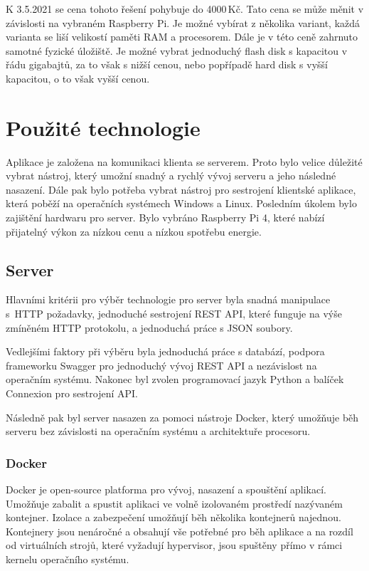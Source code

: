 \documentclass[
  glossaries,
]{kidiplom}
\begin{document}
K 3.5.2021 se cena tohoto řešení pohybuje do 4000\,Kč. Tato cena se může měnit v závislosti na vybraném Raspberry Pi. Je možné vybírat z několika variant, každá varianta se liší velikostí paměti RAM a procesorem. Dále je v této ceně zahrnuto samotné fyzické úložiště. Je možné vybrat jednoduchý flash disk s kapacitou v řádu gigabajtů, za to však s nižší cenou, nebo popřípadě hard disk s vyšší kapacitou, o to však vyšší cenou.

\clearpage
\section{Použité technologie}
Aplikace je založena na komunikaci klienta se serverem. Proto bylo velice důležité vybrat nástroj, který umožní snadný a rychlý vývoj serveru a jeho následné nasazení. Dále pak bylo potřeba vybrat nástroj pro sestrojení klientské aplikace, která poběží na operačních systémech Windows a Linux. Posledním úkolem bylo zajištění hardwaru pro server. Bylo vybráno Raspberry Pi 4, které nabízí přijatelný výkon za nízkou cenu a nízkou spotřebu energie.

\subsection{Server}
Hlavními kritérii pro výběr technologie pro server byla snadná manipulace s~HTTP požadavky, jednoduché sestrojení REST API, které funguje na výše zmíněném HTTP protokolu, a jednoduchá práce s JSON soubory.

Vedlejšími faktory při výběru byla jednoduchá práce s databází, podpora frameworku Swagger pro jednoduchý vývoj REST API a nezávislost na operačním systému. Nakonec byl zvolen programovací jazyk Python a balíček Connexion pro sestrojení API.

Následně pak byl server nasazen za pomoci nástroje Docker, který umožňuje běh serveru bez závislosti na operačním systému a architektuře procesoru.

\subsubsection{Docker}
Docker je open-source platforma pro vývoj, nasazení a spouštění aplikací. Umožňuje zabalit a spustit aplikaci 	ve volně izolovaném prostředí nazývaném kontejner. Izolace a zabezpečení umožňují běh několika kontejnerů najednou. Kontejnery jsou nenáročné a obsahují vše potřebné pro běh aplikace a na rozdíl od virtuálních strojů, které vyžadují hypervisor, jsou spuštěny přímo v rámci kernelu operačního systému. \cite{DOCKER}
\end{document}
